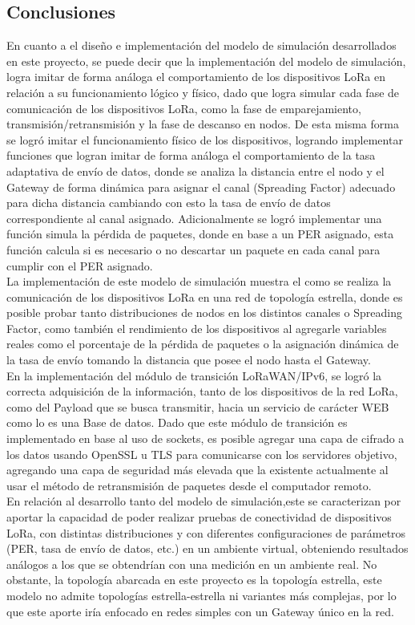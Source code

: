 \begin{justify}
\chapter{Conclusiones}
En cuanto a el diseño e implementación del modelo de simulación desarrollados en este proyecto, se puede decir que la implementación del modelo de simulación, logra imitar de forma análoga el comportamiento de los dispositivos LoRa en relación a su funcionamiento lógico y físico, dado que logra simular cada fase de comunicación de los dispositivos LoRa, como la fase de emparejamiento, transmisión/retransmisión y la fase de descanso en nodos. De esta misma forma se logró imitar el funcionamiento físico de los dispositivos, logrando implementar funciones que logran imitar de forma análoga el comportamiento de la tasa adaptativa de envío de datos, donde se analiza la distancia entre el nodo y el Gateway de forma dinámica para asignar el canal (Spreading Factor) adecuado para dicha distancia cambiando con esto la tasa de envío de datos correspondiente al canal asignado. Adicionalmente se logró implementar una función simula la pérdida de paquetes, donde en base a un PER asignado, esta función calcula si es necesario o no descartar un paquete en cada canal para cumplir con el PER asignado.\\
La implementación de este modelo de simulación muestra el como se realiza la comunicación de los dispositivos LoRa en una red de topología estrella, donde es posible probar tanto distribuciones de nodos en los distintos canales o Spreading Factor, como también el rendimiento de los dispositivos al agregarle variables reales como el porcentaje de la pérdida de paquetes o la asignación dinámica de la tasa de envío tomando la distancia que posee el nodo hasta el Gateway.\\
En la implementación del módulo de transición LoRaWAN/IPv6, se logró la correcta adquisición de la información, tanto de los dispositivos de la red LoRa, como del Payload que se busca transmitir, hacia un servicio de carácter WEB como lo es una Base de datos. Dado que este módulo de transición es implementado en base al uso de sockets, es posible agregar una capa de cifrado a los datos usando OpenSSL u TLS para comunicarse con los servidores objetivo, agregando una capa de seguridad más elevada que la existente actualmente al usar el método de retransmisión de paquetes desde el computador remoto.\\
\noindent
En relación al desarrollo tanto del modelo de simulación,este se caracterizan por aportar la capacidad de poder realizar pruebas de conectividad de dispositivos LoRa, con distintas distribuciones y con diferentes configuraciones de parámetros (PER, tasa de envío de datos, etc.) en un ambiente virtual, obteniendo resultados análogos a los que se obtendrían con una medición en un ambiente real. No obstante, la topología abarcada en este proyecto es la topología estrella, este modelo no admite topologías estrella-estrella ni variantes más complejas, por lo que este aporte iría enfocado en redes simples con un Gateway único en la red.\\

\end{justify}
